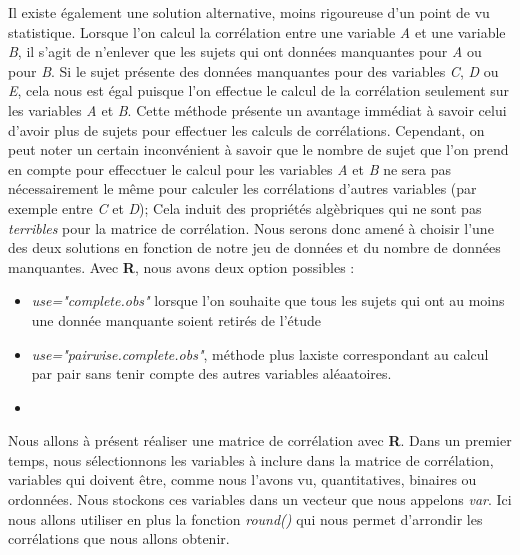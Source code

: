 Il existe également une solution alternative, moins rigoureuse d'un point de vu statistique. Lorsque l'on calcul la corrélation entre une variable \textit{A} et une variable \textit{B}, il s'agit de n'enlever que les sujets qui ont données manquantes pour \textit{A} ou pour \textit{B}. Si le sujet présente des données manquantes pour des variables \textit{C}, \textit{D} ou \textit{E}, cela nous est égal puisque l'on effectue le calcul de la corrélation seulement sur les variables \textit{A} et \textit{B}. Cette méthode présente un avantage immédiat à savoir celui d'avoir plus de sujets pour effectuer les calculs de corrélations. Cependant, on peut noter un certain inconvénient à savoir que le nombre de sujet que l'on prend en compte pour effecctuer le calcul pour les variables \textit{A} et \textit{B} ne sera pas nécessairement le même pour calculer les corrélations d'autres variables (par exemple entre \textit{C} et \textit{D}); Cela induit des propriétés algèbriques qui ne sont pas \textit{terribles} pour la matrice de corrélation.\newline
Nous serons donc amené à choisir l'une des deux solutions en fonction de notre jeu de données et du nombre de données manquantes. Avec \textbf{R}, nous avons deux option possibles :
\begin{itemize}
\item \textit{use="complete.obs"} lorsque l'on souhaite que tous les sujets qui ont au moins une donnée manquante soient retirés de l'étude 
\item \textit{use="pairwise.complete.obs"}, méthode plus laxiste correspondant au calcul par pair sans tenir compte des autres variables aléaatoires.
\item
\end{itemize}
Nous allons à présent réaliser une matrice de corrélation avec \textbf{R}.\newline
Dans un premier temps, nous sélectionnons les variables à inclure dans la matrice de
corrélation, variables qui doivent être, comme nous l'avons vu, quantitatives, binaires ou
ordonnées. Nous stockons ces variables dans un vecteur que nous appelons \textit{var}. Ici nous allons utiliser en plus la fonction \textit{round()} qui nous permet d'arrondir les corrélations que nous allons obtenir.

